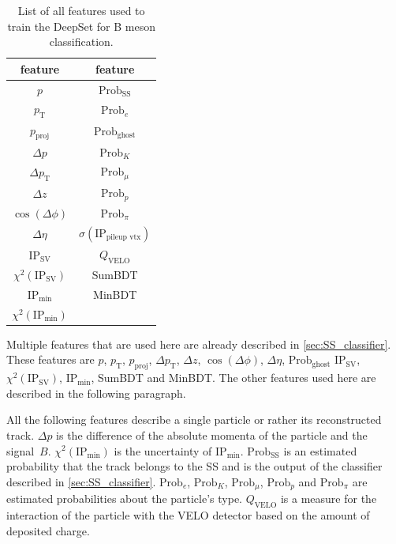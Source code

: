 \begin{table}
    \centering
    \caption{List of all features used to train the DeepSet for B meson classification.}
    \label{tab:B_features}
    \begin{tabular}{c c}
        \toprule
        feature & feature \\
        \midrule
        $p$                 & $\text{Prob}_\text{SS}$ \\ %
        $p_\text{T}$        & $\text{Prob}_e$ \\ %
        $p_\text{proj}$     & $\text{Prob}_\text{ghost}$ \\ %
        $\Delta p$          & $\text{Prob}_K$ \\ %
        $\Delta p_\text{T}$ & $\text{Prob}_\mu$ \\ %
        $\Delta z$          & $\text{Prob}_p$ \\ %
        $\cos(\Delta \phi)$ & $\text{Prob}_\pi$ \\ %
        $\Delta \eta$       & $\sigma(\text{IP}_\text{pileup vtx})$ \\ %
        $\text{IP}_\text{SV}$        & $Q_\text{VELO}$ \\ %
        $\chi^2(\text{IP}_\text{SV})$    & SumBDT \\ %
        $\text{IP}_\text{min}$               & MinBDT \\ %
        $\chi^2(\text{IP}_\text{min})$           & \\ %
        \bottomrule
    \end{tabular}
\end{table}

Multiple features that are used here are already described in \autoref{sec:SS_classifier}.
These features are 
$p$,
$p_\text{T}$, 
$p_\text{proj}$, 
$\Delta p_\text{T}$, 
$\Delta z$, 
$\cos(\Delta \phi)$, 
$\Delta \eta$, 
$\text{Prob}_\text{ghost}$
$\text{IP}_\text{SV}$, 
$\chi^2(\text{IP}_\text{SV})$, 
$\text{IP}_\text{min}$,        
SumBDT and
MinBDT.
The other features used here are described in the following paragraph.

All the following features describe a single particle or rather its reconstructed track.
$\Delta p$ is the difference of the absolute momenta of the particle and the signal~$B$.
$\chi^2(\text{IP}_\text{min})$ is the uncertainty of $\text{IP}_\text{min}$.
%
$\text{Prob}_\text{SS}$ is an estimated probability that the track belongs to the SS and is the output of the classifier described in \autoref{sec:SS_classifier}. 
$\text{Prob}_e$, 
$\text{Prob}_K$, 
$\text{Prob}_\mu$, 
$\text{Prob}_p$ and 
$\text{Prob}_\pi$ are estimated probabilities about the particle's type.
%
$Q_\text{VELO}$ is a measure for the interaction of the particle with the VELO detector based on the amount of deposited charge.


